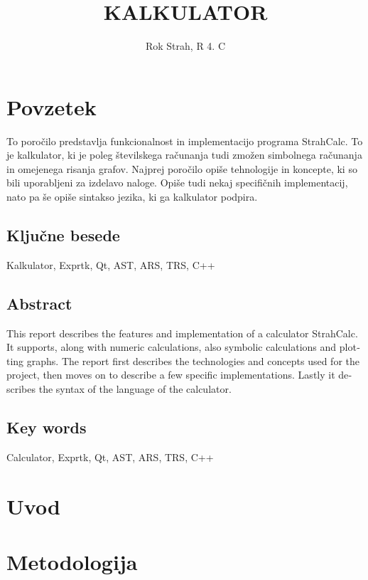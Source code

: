 \documentclass[12pt,titlepage]{report}
\title{KALKULATOR}
\author{Rok Strah, R 4. C}
\begin{document}
\maketitle

\chapter*{Povzetek}
To poročilo predstavlja funkcionalnost in implementacijo programa StrahCalc.
To je kalkulator, ki je poleg številskega računanja tudi zmožen simbolnega računanja in omejenega risanja grafov.
Najprej poročilo opiše tehnologije in koncepte, ki so bili uporabljeni za izdelavo naloge.
Opiše tudi nekaj specifičnih implementacij, nato pa še opiše sintakso jezika, ki ga kalkulator podpira.
\section*{Ključne besede}
Kalkulator, Exprtk, Qt, AST, ARS, TRS, C++
\begin{otherlanguage}{british}
\chapter*{Abstract}
This report describes the features and implementation of a calculator StrahCalc. 
It supports, along with numeric calculations, also symbolic calculations and plotting graphs.
The report first describes the technologies and concepts used for the project, then moves on to describe a few specific implementations.
Lastly it describes the syntax of the language of the calculator.
\section*{Key words}
Calculator, Exprtk, Qt, AST, ARS, TRS, C++
\end{otherlanguage}
\thispagestyle{empty}


{\begin{spacing}{1.15}
\pagestyle{empty}
\clearpage
\tableofcontents
\clearpage
\listoffigures
\pagestyle{plain}
\end{spacing}}
\thispagestyle{empty}
\clearpage
\setcounter{page}{1}

\chapter{Uvod}
\label{intro}

\chapter{Metodologija}
\label{methods}
\end{document}
